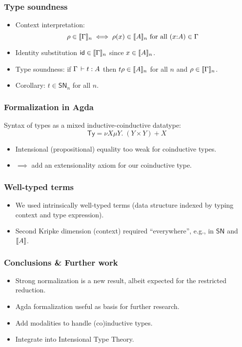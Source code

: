 \documentclass[t]{beamer}
\renewcommand{\SN}{\mathsf{SN}}
\newcommand{\tid}{\mathsf{id}}
\newcommand{\cAnn}{\color{red!80!black}}%
\renewcommand{\emph}[1]{{\cAnn#1}}
\begin{document}
\begin{frame}%
  \frametitle{Type soundness}
  \begin{itemize}
  \item Context interpretation:
\[
  \rho \in \llbracket \Gamma \rrbracket_{n} \iff \rho(x) \in \llbracket A \rrbracket_{n} \ \mbox{for all}\ 
  (x{:}A) \in \Gamma
\]
\vspace{-2ex}
  \item Identity substitution $\tid \in \Den \Gamma n$ since $x \in \llbracket A \rrbracket_{n}$.
  \item Type soundness: if $\Gamma \,\vdash t : A$ then $t \rho \in \llbracket A \rrbracket_{n}$ for all $n$ and $\rho \in \llbracket \Gamma \rrbracket_{n}$.
  \item Corollary: $t \in \SN_n$ for all $n$.
  \end{itemize}
\end{frame}


\begin{frame}%
  \frametitle{Formalization in Agda}
  \vspace{-10pt}
  Syntax of types as a mixed inductive-coinductive datatype:
  \vspace{-5pt}
  \[\mathsf{Ty} = \nu X \mu Y.\; (Y \times Y) + X \]
  \vspace{-30pt}
  
  \begin{itemize}
  \item Intensional (propositional) equality too weak for coinductive
    types.
  \item $\implies$ add an extensionality axiom for our coinductive type.
  \end{itemize}
\end{frame}


\begin{frame}%
  \frametitle{Well-typed terms}
  
  \begin{itemize}
  \item We used intrinsically well-typed terms (data structure indexed
    by typing context and type expression).
  \item Second Kripke dimension (context) required ``everywhere'', e.g.,
    in $\SN$ and $\llbracket A \rrbracket$.
  \end{itemize}
\end{frame}




\begin{frame}%
  \frametitle{Conclusions \& Further work}
  \begin{itemize}
  \item \emph{Strong} normalization is a new result, albeit expected for the restricted reduction.
  \item Agda formalization useful as basis for further research.
  \item Add modalities to handle (co)inductive types.
  \item Integrate into Intensional Type Theory.
  \end{itemize}
\end{frame}
\end{document}
